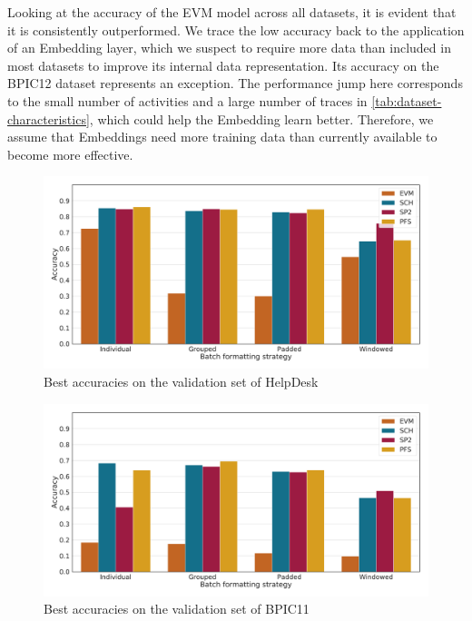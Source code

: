 Looking at the accuracy of the EVM model across all datasets, it is evident that it is consistently outperformed. We trace the low accuracy back to the application of an Embedding layer, which we suspect to require more data than included in most datasets to improve its internal data representation.
Its accuracy on the BPIC12 dataset represents an exception. The performance jump here corresponds to the small number of activities and a large number of traces in \autoref{tab:dataset-characteristics}, which could help the Embedding learn better. Therefore, we assume that Embeddings need more training data than currently available to become more effective.

\begin{figure}
    \centering
    \includegraphics[width=\textwidth]{gfx/helpdesk/accuracies.pdf}
    \caption{Best accuracies on the validation set of HelpDesk}
    \label{fig:max-accuracies-helpdesk}
\end{figure}
\begin{figure}
    \centering
    \includegraphics[width=\textwidth]{gfx/bpic2011/accuracies.pdf}
    \caption{Best accuracies on the validation set of BPIC11}
    \label{fig:max-accuracies-bpic2011}
\end{figure}
